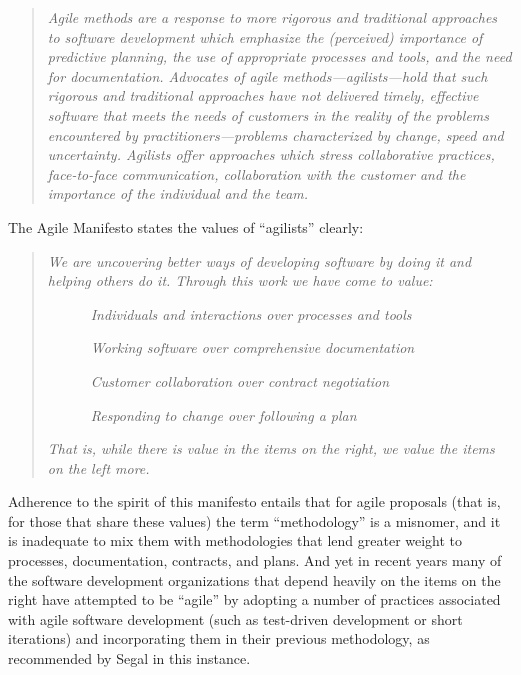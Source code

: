 \begin{quote}
\emph{Agile methods are a response to more rigorous and traditional approaches to software development which emphasize the (perceived) importance of predictive planning, the use of appropriate processes and tools, and the need for documentation. Advocates of agile methods---agilists---hold that such rigorous and traditional approaches have not delivered timely, effective software that meets the needs of customers in the reality of the problems encountered by practitioners---problems characterized by change, speed and uncertainty. Agilists offer approaches which stress collaborative practices, face-to-face communication, collaboration with the customer and the importance of the individual and the team.}
\end{quote}

The Agile Manifesto \cite{Beck2001} states the values of ``agilists'' clearly:

\begin{quote}
\emph{We are uncovering better ways of developing software by doing it and helping others do it. Through this work we have come to value:}

\emph{~~~~~~Individuals and interactions over processes and tools}

\emph{~~~~~~Working software over comprehensive documentation}

\emph{~~~~~~Customer collaboration over contract negotiation}

\emph{~~~~~~Responding to change over following a plan}

\emph{That is, while there is value in the items on the right, we value the items on the left more.}
\end{quote}

Adherence to the spirit of this manifesto entails that for agile proposals (that is, for those that share these values) the term ``methodology'' is a misnomer, and it is inadequate to mix them with methodologies that lend greater weight to processes, documentation, contracts, and plans. And yet in recent years many of the software development organizations that depend heavily on the items on the right have attempted to be ``agile'' by adopting a number of practices associated with agile software development (such as test-driven development or short iterations) and incorporating them in their previous methodology, as recommended by Segal in this instance.

